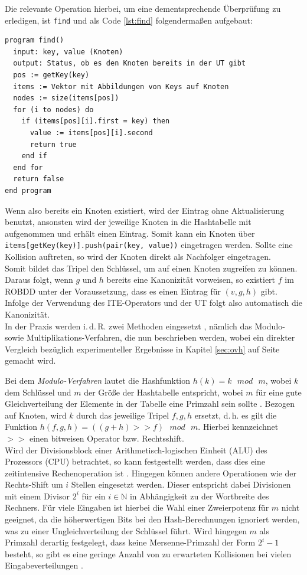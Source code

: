 Die relevante Operation hierbei, um eine dementsprechende Überprüfung zu erledigen, ist \texttt{find} und als Code \ref{lst:find} folgendermaßen aufgebaut:
\lstset{language=xml}
\begin{lstlisting}[frame=htrbl, caption={Implementierung von {\ttfamily find}}, label={lst:find}]
program find()
  input: key, value (Knoten)
  output: Status, ob es den Knoten bereits in der UT gibt
  pos := getKey(key)
  items := Vektor mit Abbildungen von Keys auf Knoten
  nodes := size(items[pos])
  for (i to nodes) do
    if (items[pos][i].first = key) then
      value := items[pos][i].second
      return true
    end if
  end for
  return false
end program
\end{lstlisting}
Wenn also bereits ein Knoten existiert, wird der Eintrag ohne Aktualisierung benutzt, ansonsten wird der jeweilige Knoten in die Hashtabelle mit aufgenommen und erhält einen Eintrag. Somit kann ein Knoten über \texttt{items[getKey(key)].push(pair(key, value))} eingetragen werden. Sollte eine Kollision auftreten, so wird der Knoten direkt als Nachfolger eingetragen.\\
Somit bildet das Tripel den Schlüssel, um auf einen Knoten zugreifen zu können. Daraus folgt, wenn $g$ und $h$ bereits eine Kanonizität vorweisen, so existiert $f$ im ROBDD unter der Voraussetzung, dass es einen Eintrag für $(v, g, h)$ gibt. Infolge der Verwendung des ITE-Operators und der UT folgt also automatisch die Kanonizität.\\
In der Praxis werden i.\,d.\,R. zwei Methoden eingesetzt \cite[S.72-73]{h2002}, nämlich das Modulo- sowie Multiplikations-Verfahren, die nun beschrieben werden, wobei ein direkter Vergleich bezüglich experimenteller Ergebnisse in Kapitel \ref{sec:ovh} auf Seite \pageref{sec:ovh} gemacht wird.

\label{sec:mod}
Bei dem \emph{Modulo-Verfahren} lautet die Hashfunktion $h(k) = k \text{ }mod\text{ } m$, wobei $k$ dem Schlüssel und $m$ der Größe der Hashtabelle entspricht, wobei $m$ für eine gute Gleichverteilung der Elemente in der Tabelle eine Primzahl sein sollte \cite{k2011}. Bezogen auf Knoten, wird $k$ durch das jeweilige Tripel $f, g, h$ ersetzt, d.\,h. es gilt die Funktion $h(f, g, h) = ( (g + h) >> f) \text{ }mod\text{ } m$. Hierbei kennzeichnet $>>$ einen bitweisen Operator bzw. Rechtsshift.\\
Wird der Divisionsblock einer Arithmetisch-logischen Einheit (ALU) des Prozessors (CPU) betrachtet, so kann festgestellt werden, dass dies eine zeitintensive Rechenoperation ist \cite[S.73]{h2002}. Hingegen können andere Operationen wie der Rechts-Shift um $i$ Stellen eingesetzt werden. Dieser entspricht dabei Divisionen mit einem Divisor $2^i$ für ein $i \in \mathbb{N}$ in Abhängigkeit zu der Wortbreite des Rechners. Für viele Eingaben ist hierbei die Wahl einer Zweierpotenz für $m$ nicht geeignet, da die höherwertigen Bits bei den Hash-Berechnungen ignoriert werden, was zu einer Ungleichverteilung der Schlüssel führt. Wird hingegen $m$ als Primzahl derartig festgelegt, dass keine Mersenne-Primzahl der Form $2^i - 1$ besteht, so gibt es eine geringe Anzahl von zu erwarteten Kollisionen bei vielen Eingabeverteilungen \cite[S.231]{clrs2001}.

